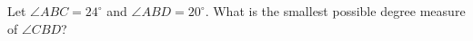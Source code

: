 Let $\angle ABC=24^\circ$ and $\angle ABD=20^\circ$. What is the smallest possible degree measure of $\angle CBD$?
